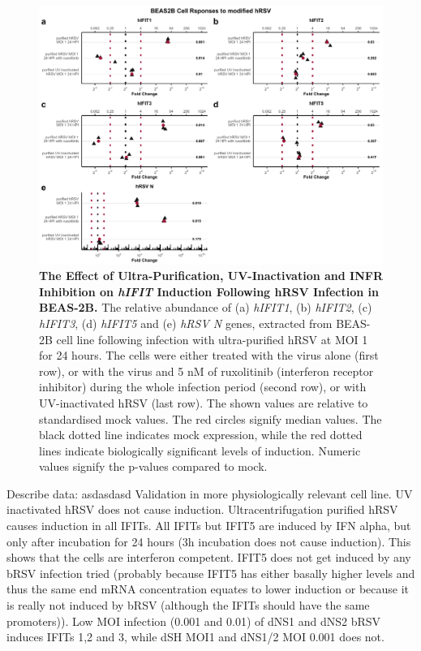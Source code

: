 \begin{figure}
    \centering
    \includegraphics[width=1\linewidth]{06. Chapter 1/Figs/01. Induction/10. beas2b_hrsv.pdf}
    \caption[The Effect of Ultra-Purification, UV-Inactivation and INFR Inhibition on \textit{hIFIT} Induction Following hRSV Infection in BEAS-2B.]{\textbf{The Effect of Ultra-Purification, UV-Inactivation and INFR Inhibition on \textit{hIFIT} Induction Following hRSV Infection in BEAS-2B.} The relative abundance of (a) \textit{hIFIT1}, (b) \textit{hIFIT2}, (c) \textit{hIFIT3}, (d) \textit{hIFIT5} and (e) \textit{hRSV N} genes, extracted from BEAS-2B cell line following infection with ultra-purified hRSV at MOI 1 for 24 hours. The cells were either treated with the virus alone (first row), or with the virus and 5 nM of ruxolitinib (interferon receptor inhibitor) during the whole infection period (second row), or with UV-inactivated hRSV (last row). The shown values are relative to standardised mock values. The red circles signify median values. The black dotted line indicates mock expression, while the red dotted lines indicate biologically significant levels of induction. Numeric values signify the p-values compared to mock.}
    \label{The effect of ultra-purification, UV-inactivation and INFR inhibition on hIFIT induction following hRSV infection in BEAS-2B}
\end{figure}

Describe data: \newline
asdasdasd \newline
Validation in more physiologically relevant cell line. UV inactivated hRSV does not cause induction. Ultracentrifugation purified hRSV causes induction in all IFITs. All IFITs but IFIT5 are induced by IFN alpha, but only after incubation for 24 hours (3h incubation does not cause induction). This shows that the cells are interferon competent. IFIT5 does not get induced by any bRSV infection tried (probably because IFIT5 has either basally higher levels and thus the same end mRNA concentration equates to lower induction or because it is really not induced by bRSV (although the IFITs should have the same promoters)). Low MOI infection (0.001 and 0.01) of dNS1 and dNS2 bRSV induces IFITs 1,2 and 3, while dSH MOI1 and dNS1/2 MOI 0.001 does not. 

